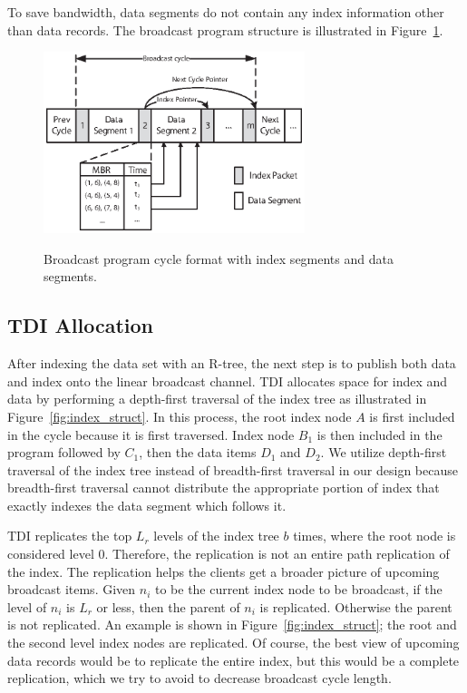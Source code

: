 To save bandwidth, data segments do not contain any index
information other than data records. The broadcast program
structure is illustrated in Figure~\ref{fig:index_packet}.

\begin{figure}[!t]
\begin{center}
\includegraphics[width=3.0in]{Figures/index_packet.eps}
\vspace*{-5pt} \caption{Broadcast program cycle format with index
segments and data segments.} \vspace*{-10pt}
\label{fig:index_packet}
\end{center}
\end{figure}

\subsection{TDI Allocation}

After indexing the data set with an R-tree, the next step is to
publish both data and index onto the linear broadcast channel. TDI
allocates space for index and data by performing a depth-first
traversal of the index tree as illustrated in
Figure~\ref{fig:index_struct}. In this process, the root index
node $A$ is first included in the cycle because it is first
traversed. Index node $B_1$ is then included in the program
followed by $C_1$, then the data items $D_1$ and $D_2$. We utilize
depth-first traversal of the index tree instead of breadth-first
traversal in our design because breadth-first traversal cannot
distribute the appropriate portion of index that exactly indexes
the data segment which follows it.


TDI replicates the top $L_r$ levels of the index tree $b$ times,
where the root node is considered level 0. Therefore, the
replication is not an entire path replication of the index. The
replication helps the clients get a broader picture of upcoming
broadcast items. Given $n_i$ to be the current index node to be
broadcast, if the level of $n_i$ is $L_r$ or less, then the parent
of $n_i$ is replicated. Otherwise the parent is not replicated. An
example is shown in Figure~\ref{fig:index_struct}; the root and
the second level index nodes are replicated. Of course, the best
view of upcoming data records would be to replicate the entire
index, but this would be a complete replication, which we try to
avoid to decrease broadcast cycle length.

